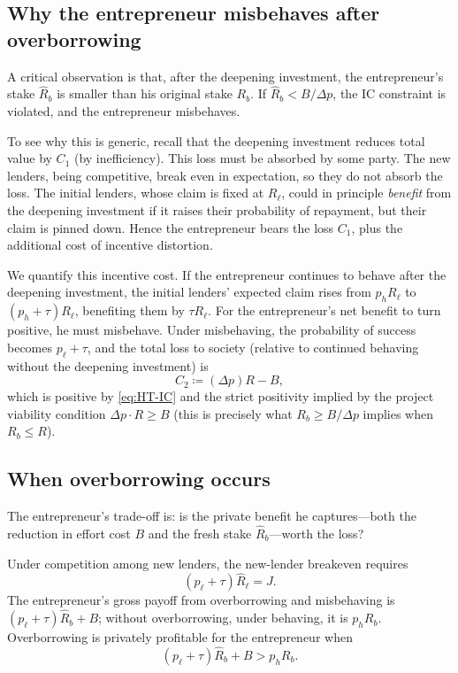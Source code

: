 \documentclass[11pt,a4paper,oneside]{book}
\def\leq{\leqslant}
\def\geq{\geqslant}
\theoremstyle{plain}
\theoremstyle{definition}
\theoremstyle{remark}
\numberwithin{equation}{chapter}
\begin{document}
\subsection{Why the entrepreneur misbehaves after overborrowing}

A critical observation is that, after the deepening investment, the entrepreneur's stake $\widehat{R}_b$ is smaller than his original stake $R_b$.
If $\widehat{R}_b < B/\Delta p$, the IC constraint is violated, and the entrepreneur misbehaves.

To see why this is generic, recall that the deepening investment reduces total value by $C_1$ (by inefficiency).
This loss must be absorbed by some party.
The new lenders, being competitive, break even in expectation, so they do not absorb the loss.
The initial lenders, whose claim is fixed at $R_\ell$, could in principle \emph{benefit} from the deepening investment if it raises their probability of repayment, but their claim is pinned down.
Hence the entrepreneur bears the loss $C_1$, plus the additional cost of incentive distortion.

We quantify this incentive cost.
If the entrepreneur continues to behave after the deepening investment, the initial lenders' expected claim rises from $p_h R_\ell$ to $(p_h + \tau) R_\ell$, benefiting them by $\tau R_\ell$.
For the entrepreneur's net benefit to turn positive, he must misbehave.
Under misbehaving, the probability of success becomes $p_\ell + \tau$, and the total loss to society (relative to continued behaving without the deepening investment) is
\begin{equation}\label{eq:HT-C2}
  C_2 \coloneqq (\Delta p) R - B,
\end{equation}
which is positive by \eqref{eq:HT-IC} and the strict positivity implied by the project viability condition $\Delta p \cdot R \geq B$ (this is precisely what $R_b \geq B/\Delta p$ implies when $R_b \leq R$).

\subsection{When overborrowing occurs}

The entrepreneur's trade-off is: is the private benefit he captures---both the reduction in effort cost $B$ and the fresh stake $\widehat{R}_b$---worth the loss?

Under competition among new lenders, the new-lender breakeven requires
\begin{equation}\label{eq:HT-new-lender-BE}
  (p_\ell + \tau) \widehat{R}_\ell = J.
\end{equation}
The entrepreneur's gross payoff from overborrowing and misbehaving is $(p_\ell + \tau) \widehat{R}_b + B$; without overborrowing, under behaving, it is $p_h R_b$.
Overborrowing is privately profitable for the entrepreneur when
\begin{equation*}
  (p_\ell + \tau) \widehat{R}_b + B > p_h R_b.
\end{equation*}
\end{document}
